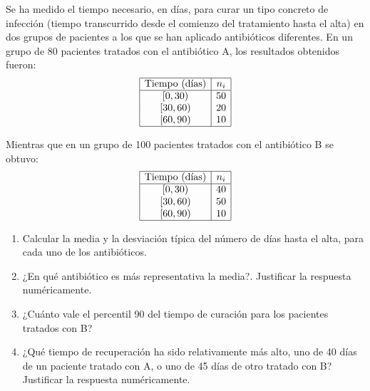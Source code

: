 {Se ha medido el tiempo necesario, en días, para curar un tipo concreto de infección (tiempo transcurrido desde el comienzo del tratamiento hasta el alta) en dos grupos de pacientes a los que se han aplicado antibióticos diferentes.
En un grupo de 80 pacientes tratados con el antibiótico A, los resultados obtenidos fueron:
\[
\begin{array}{|c|c|}
\hline
\mbox{Tiempo (días)} & n_i \\
\hline
{[0,30)} & 50 \\
{[30,60)} & 20 \\
{[60,90)} & 10 \\
\hline
\end{array}
\]

Mientras que en un grupo de 100 pacientes tratados con el antibiótico B se obtuvo:
\[
\begin{array}{|c|c|}
\hline
\mbox{Tiempo (días)} & n_i \\
\hline
{[0,30)} & 40 \\
{[30,60)} & 50 \\
{[60,90)} & 10 \\
\hline
\end{array}
\]

\begin{enumerate}
\item Calcular la media y la desviación típica del número de días hasta el alta, para cada uno de los antibióticos.
\item ¿En qué antibiótico es más representativa la media?. Justificar la respuesta numéricamente.
\item ¿Cuánto vale el percentil 90 del tiempo de curación para los pacientes tratados con B?
\item ¿Qué tiempo de recuperación ha sido relativamente más alto, uno de 40 días de un paciente tratado con A, o uno de 45 días de otro tratado con B? Justificar la respuesta numéricamente.
\end{enumerate}
}


